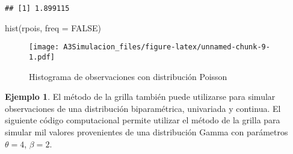 \documentclass[
  12pt,
  spanish,
]{book}
\newenvironment{Shaded}{\begin{snugshade}}{\end{snugshade}}
\newcommand{\AttributeTok}[1]{\textcolor[rgb]{0.77,0.63,0.00}{#1}}
\newcommand{\ConstantTok}[1]{\textcolor[rgb]{0.00,0.00,0.00}{#1}}
\newcommand{\FunctionTok}[1]{\textcolor[rgb]{0.00,0.00,0.00}{#1}}
\newcommand{\NormalTok}[1]{#1}
\theoremstyle{definition}
\theoremstyle{definition}
\newtheorem{example}{Ejemplo}[chapter]
\theoremstyle{definition}
\theoremstyle{definition}
\theoremstyle{remark}
\begin{document}
\begin{verbatim}
## [1] 1.899115
\end{verbatim}

\begin{Shaded}
\begin{Highlighting}[]
\FunctionTok{hist}\NormalTok{(rpois, }\AttributeTok{freq =} \ConstantTok{FALSE}\NormalTok{)}
\end{Highlighting}
\end{Shaded}

\begin{figure}
\centering
\texttt{[image: A3Simulacion\_files/figure-latex/unnamed-chunk-9-1.pdf]}
\caption{\label{fig:unnamed-chunk-9}Histograma de observaciones con distribución Poisson}
\end{figure}

\begin{example}
\protect\hypertarget{exm:unnamed-chunk-10}{}{\label{exm:unnamed-chunk-10} }El método de la grilla también puede utilizarse para simular observaciones de una distribución biparamétrica, univariada y continua. El siguiente código computacional permite utilizar el método de la grilla para simular mil valores provenientes de una distribución Gamma con parámetros \(\theta = 4\), \(\beta = 2\).
\end{example}
\end{document}
